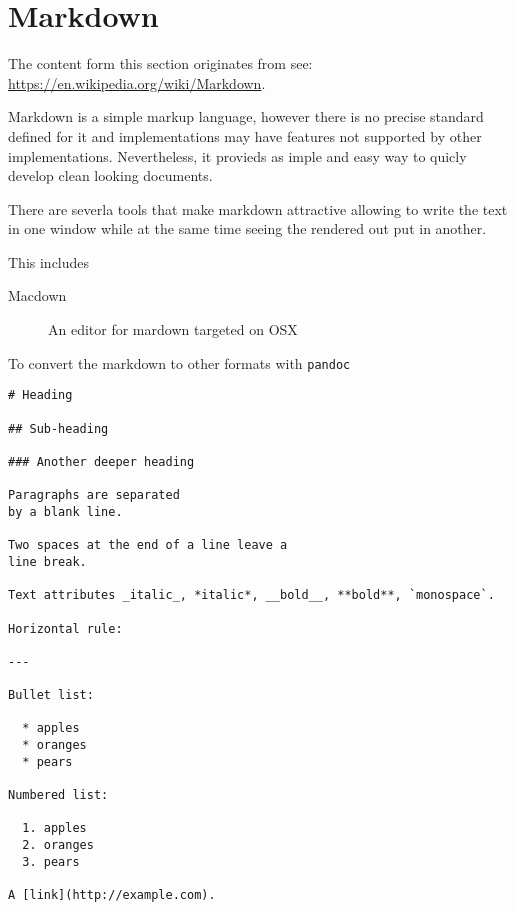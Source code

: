 \FILENAME

\section{Markdown}\label{markdown}

The content form this section originates from see:
\url{https://en.wikipedia.org/wiki/Markdown}.

Markdown is a simple markup language, however there is no precise
standard defined for it and implementations may have features not
supported by other implementations. Nevertheless, it provieds as imple
and easy way to quicly develop clean looking documents.

There are severla tools that make markdown attractive allowing to
write the text in one window while at the same time seeing the
rendered out put in another.

This includes

\begin{description}

\item[Macdown] An editor for mardown targeted on OSX

\end{description}

To convert the markdown to other formats with \verb|pandoc|

\begin{verbatim}
# Heading

## Sub-heading

### Another deeper heading
 
Paragraphs are separated
by a blank line.

Two spaces at the end of a line leave a  
line break.

Text attributes _italic_, *italic*, __bold__, **bold**, `monospace`.

Horizontal rule:

---

Bullet list:

  * apples
  * oranges
  * pears

Numbered list:

  1. apples
  2. oranges
  3. pears

A [link](http://example.com).

\end{verbatim}